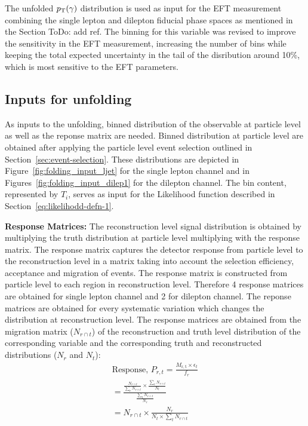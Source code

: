 The unfolded $p_{\text{T}}(\gamma)$ distribution is used as input for the EFT measurement combining the single lepton and dilepton fiducial phase spaces as mentioned in the Section {ToDo: add ref}. The binning for this variable was revised to improve the sensitivity in the EFT measurement, increasing the number of bins while keeping the total expected uncertainty in the tail of the disribution around 10\%, which is most sensitive to the EFT parameters.  



\subsection{Inputs for unfolding}
\label{sec:inputs-for-unfolding}
As inputs to the unfolding, binned distribution of the observable at particle level as well as the reponse matrix are needed. Binned distribution at particle level are obtained after applying the particle level event selection outlined in Section~\ref{sec:event-selection}. These distributions are depicted in Figure~\ref{fig:folding_input_ljet} for the single lepton channel and in Figures~\ref{fig:folding_input_dilep1} for the dilepton channel. The bin content, represented by $T_{i}$, serves as input for the Likelihood function described in Section~\ref{eq:likelihodd-defn-1}.

\textbf{Response Matrices:}
The reconstruction level signal distribution is obtained by multiplying the truth distribution at particle level multiplying with the response matrix. The response matrix captures the detector response from particle level to the reconstruction level in a matrix taking into account the selection efficiency, acceptance and migration of events. The response matrix is constructed from particle level to each region in reconstruction level. Therefore 4 response matrices are obtained for single lepton channel and 2 for dilepton channel. The reponse matrices are obtained for every systematic variation which changes the distribution at reconstruction level. The response matrices are obtained from the migration matrix ($N_{r \cap t}$) of the reconstruction and truth level distribution of the corresponding variable and the corresponding truth and reconstructed distributions ($N_{r}$ and $N_{t}$):
\begin{align}
    \text{Response, } P_{r,t} = \frac{M_{\mathrm{r,t}} \times \epsilon_{t}}{f_{r}}\\
    = \frac{\frac{N_{r \cap t}}{\sum_{r} N_{r \cap t}} \times \frac{\sum_{r} N_{r \cap t}}{N_{t}}}{\frac{\sum_{t} N_{r \cap t}}{N_{r}}}\\
    = N_{r \cap t} \times \frac{N_{r}}{N_{t}\times \sum_{t} N_{r \cap t}}
\end{align}

